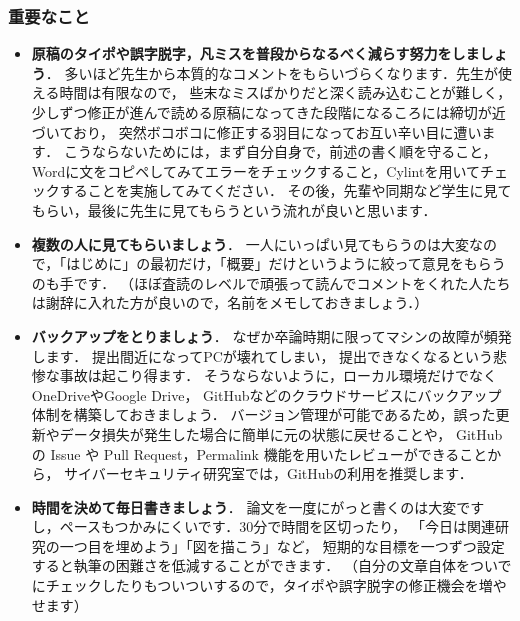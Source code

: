 \subsubsection{重要なこと}
\begin{itemize}
    \item \textbf{原稿のタイポや誤字脱字，凡ミスを普段からなるべく減らす努力をしましょう}．
    多いほど先生から本質的なコメントをもらいづらくなります．先生が使える時間は有限なので，
    些末なミスばかりだと深く読み込むことが難しく，少しずつ修正が進んで読める原稿になってきた段階になるころには締切が近づいており，
    突然ボコボコに修正する羽目になってお互い辛い目に遭います．
    こうならないためには，まず自分自身で，前述の書く順を守ること，Wordに文をコピペしてみてエラーをチェックすること，Cylint\cite{cylint}を用いてチェックすることを実施してみてください．
    その後，先輩や同期など学生に見てもらい，最後に先生に見てもらうという流れが良いと思います．
    \item \textbf{複数の人に見てもらいましょう}．
    一人にいっぱい見てもらうのは大変なので，「はじめに」の最初だけ，「概要」だけというように絞って意見をもらうのも手です．
    （ほぼ査読のレベルで頑張って読んでコメントをくれた人たちは謝辞に入れた方が良いので，名前をメモしておきましょう．）
    \item \textbf{バックアップをとりましょう}．
    なぜか卒論時期に限ってマシンの故障が頻発します． 提出間近になってPCが壊れてしまい，
    提出できなくなるという悲惨な事故は起こり得ます． そうならないように，ローカル環境だけでなくOneDriveやGoogle Drive，
    GitHubなどのクラウドサービスにバックアップ体制を構築しておきましょう．
    バージョン管理が可能であるため，誤った更新やデータ損失が発生した場合に簡単に元の状態に戻せることや，
    GitHub の Issue や Pull Request，Permalink 機能を用いたレビューができることから，
    サイバーセキュリティ研究室では，GitHubの利用を推奨します\cite{cytex}．
    \item \textbf{時間を決めて毎日書きましょう}．
    論文を一度にがっと書くのは大変ですし，ペースもつかみにくいです．30分で時間を区切ったり，
    「今日は関連研究の一つ目を埋めよう」「図を描こう」など，
    短期的な目標を一つずつ設定すると執筆の困難さを低減することができます．
    （自分の文章自体をついでにチェックしたりもついついするので，タイポや誤字脱字の修正機会を増やせます）
\end{itemize}


